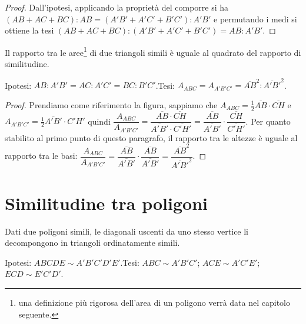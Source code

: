 \begin{proof}
Dall'ipotesi, applicando la proprietà del comporre si ha $(AB+AC+BC):AB=(A'B'+A'C'+B'C'):A'B'$ e permutando i medi si ottiene la tesi $(AB+AC+BC):(A'B'+A'C'+B'C')=AB:A'B'$.
\end{proof}

\begin{teorema}\label{teo:6.4}%
Il rapporto tra le aree\footnote{una definizione più rigorosa dell'area di un poligono verrà data nel capitolo seguente.} di due triangoli simili è uguale al quadrato del rapporto di similitudine.
\end{teorema}

\noindent Ipotesi: $AB:A'B'=AC:A'C'=BC:B'C'$.\tab Tesi: $A_{ABC}=A_{A'B'C'}=\overline{AB}^2:\overline{A'B'}^2$.

\begin{figure*}[!htb]
	\centering
\end{figure*}

\begin{proof}
Prendiamo come riferimento la figura, sappiamo che 
$A_{ABC}=\frac{1}{2}\overline{AB}\cdot\overline{CH}$ e $A_{A'B'C'}=\frac{1}{2}\overline{A'B'}\cdot{C'H'}$ quindi $\dfrac{A_{ABC}}{A_{A'B'C'}} = \dfrac{\overline{AB}\cdot\overline{CH}}{\overline{A'B'}\cdot\overline{C'H'}} = \dfrac{\overline{AB}}{\overline{A'B'}}\cdot \dfrac{\overline{CH}}{\overline{C'H'}}$.
Per quanto stabilito al primo punto di questo paragrafo, il rapporto tra le altezze è uguale al rapporto tra le basi: 
$\dfrac{A_{ABC}}{A_{A'B'C'}} = \dfrac{\overline{AB}}{\overline{A'B'}}\cdot \dfrac{\overline{AB}}{\overline{A'B'}} = \dfrac{\overline{AB}^2}{\overline{A'B'}^2}$.
\end{proof}


\section{Similitudine tra poligoni}\label{sect:similitudine_poligoni}

\begin{teorema}
Dati due poligoni simili, le diagonali uscenti da uno stesso vertice li decompongono in triangoli ordinatamente simili.
\end{teorema}

\noindent Ipotesi: $ABCDE\sim A'B'C'D'E'$.\tab Tesi: $ABC\sim A'B'C'$; $ACE\sim A'C'E'$; $ECD\sim E'C'D'$.

\begin{figure*}[!htb]
	\centering
\end{figure*}

